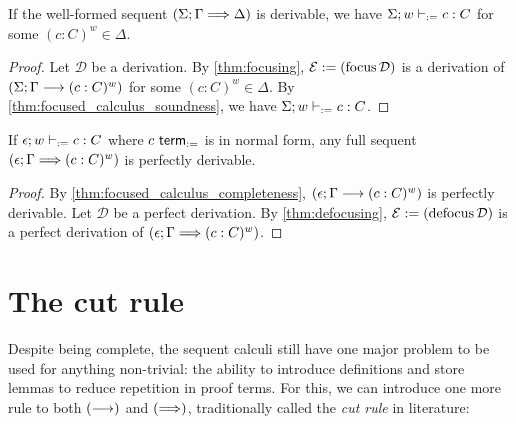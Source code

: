 \documentclass[twoside]{report}
\begin{document}
\def\proofSkipAmount{\defaultProofSkipAmount}

\begin{proposition}
    \label{thm:defocused_calculus_soundness}
    If the well-formed sequent $(\Sigma; \Gamma \Longrightarrow \Delta)$ is derivable, we have $\Sigma; w \vdash_{:=} c : C$ for some $(c : C)^w \in \Delta$.
\end{proposition}

\begin{proof}
    Let $\mathcal D$ be a derivation. By \cref{thm:focusing}, $\mathcal E := (\operatorname{focus} \mathcal D)$ is a derivation of $(\Sigma; \Gamma \longrightarrow (c : C)^w)$ for some $(c : C)^w \in \Delta$. By \cref{thm:focused_calculus_soundness}, we have $\Sigma; w \vdash_{:=} c : C$.
\end{proof}

\begin{proposition}
    \label{thm:defocused_calculus_completeness}
    If $\epsilon; w \vdash_{:=} c : C$ where $c \ \mathsf{term}_{:=}$ is in normal form, any full sequent $(\epsilon; \Gamma \Longrightarrow (c : C)^w)$ is perfectly derivable.
\end{proposition}

\begin{proof}
    By \cref{thm:focused_calculus_completeness}, $(\epsilon; \Gamma \longrightarrow (c : C)^w)$ is perfectly derivable. Let $\mathcal D$ be a perfect derivation. By \cref{thm:defocusing}, $\mathcal E := (\operatorname{defocus} \mathcal D)$ is a perfect derivation of $(\epsilon; \Gamma \Longrightarrow (c : C)^w)$.
\end{proof}

\section{The cut rule}
\label{sec:sequent_calculi_cut_rule}

Despite being complete, the sequent calculi still have one major problem to be used for anything non-trivial: the ability to introduce definitions and store lemmas to reduce repetition in proof terms. For this, we can introduce one more rule to both $(\longrightarrow)$ and $(\Longrightarrow)$, traditionally called the \emph{cut rule} in literature:

\begin{prooftree}
\end{prooftree}
\end{document}
